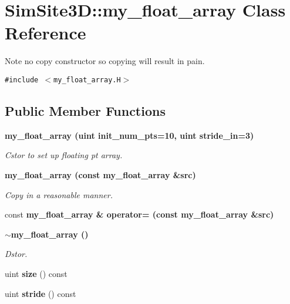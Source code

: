 \section{SimSite3D::my\_\-float\_\-array Class Reference}
\label{classSimSite3D_1_1my__float__array}
Note no copy constructor so copying will result in pain.  


{\tt \#include $<$my\_\-float\_\-array.H$>$}

\subsection*{Public Member Functions}
\begin{CompactItemize}
\item 
\bf{my\_\-float\_\-array} (uint init\_\-num\_\-pts=10, uint stride\_\-in=3)\label{classSimSite3D_1_1my__float__array_d9b0cb450e669b9e4b7bdced7c36a466}

\begin{CompactList}\small\item\em Cstor to set up floating pt array. \item\end{CompactList}\item 
\bf{my\_\-float\_\-array} (const \bf{my\_\-float\_\-array} \&src)\label{classSimSite3D_1_1my__float__array_a6269a44c631f4fe16c92229f4f128e5}

\begin{CompactList}\small\item\em Copy in a reasonable manner. \item\end{CompactList}\item 
const \bf{my\_\-float\_\-array} \& \bf{operator=} (const \bf{my\_\-float\_\-array} \&src)
\item 
\bf{$\sim$my\_\-float\_\-array} ()\label{classSimSite3D_1_1my__float__array_604d58f23c22a431770fb11f97fc2a99}

\begin{CompactList}\small\item\em Dstor. \item\end{CompactList}\item 
uint \textbf{size} () const \label{classSimSite3D_1_1my__float__array_c15df63500d30ce66dee8a118b69821d}

\item 
uint \textbf{stride} () const \label{classSimSite3D_1_1my__float__array_ca02b23f8fd6e8a60a28e4cfae8a648e}


\end{CompactItemize}
